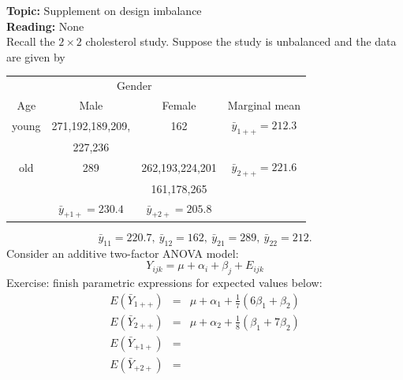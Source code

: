 \newpage
\noindent
{\bf Topic:} Supplement on design imbalance \\
{\bf Reading:} None \\
\bigkn
\noindent
Recall the $2\times 2$ cholesterol study.  Suppose the study is
unbalanced and the data are given by
\begin{center}
\begin{tabular}{|c|cc|c|} \hline
& \multicolumn{2}{c}{Gender} & \\
Age & Male & Female & Marginal mean \\ \hline
young & 271,192,189,209, & 162 & $\bar{y}_{1++}=212.3$ \\ 
& 227,236 & & \\  \hline
old & 289 & 262,193,224,201 & $\bar{y}_{2++}=221.6$ \\
& & 161,178,265 & \\  \hline
& $\bar{y}_{+1+}=230.4$ & $\bar{y}_{+2+}=205.8$ & \\ \hline
\end{tabular}
\end{center}
$$\bar{y}_{11}=220.7,\ \bar{y}_{12}=162, \ \bar{y}_{21}=289,\ \bar{y}_{22}=212.$$
\noindent
Consider an additive two-factor ANOVA model:
$$Y_{ijk} = \mu + \alpha_i + \beta_j + E_{ijk}$$ 
Exercise: finish parametric expressions for expected values below:
\begin{eqnarray*}
E(\bar{Y}_{1++}) & = & \mu + \alpha_1 + \frac{1}{7}\left(6 \beta_1 + \beta_2\right) \\
E(\bar{Y}_{2++}) & = & \mu + \alpha_2 + \frac{1}{8}\left(\beta_1 + 7\beta_2\right) \\
E(\bar{Y}_{+1+}) & = & \\ %
E(\bar{Y}_{+2+}) & = & %
\end{eqnarray*}
